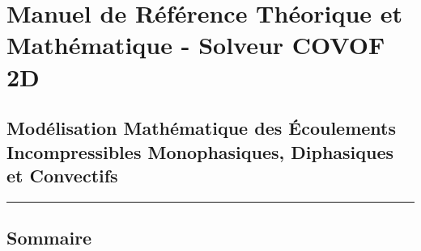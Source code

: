 \documentclass[
  french,
]{article}
\author{}
\date{}
\begin{document}
\section{Manuel de Référence Théorique et Mathématique - Solveur COVOF
2D}\label{manuel-de-ruxe9fuxe9rence-thuxe9orique-et-mathuxe9matique---solveur-covof-2d}

\subsection{Modélisation Mathématique des Écoulements Incompressibles
Monophasiques, Diphasiques et
Convectifs}\label{moduxe9lisation-mathuxe9matique-des-uxe9coulements-incompressibles-monophasiques-diphasiques-et-convectifs}

\begin{center}\rule{0.5\linewidth}{0.5pt}\end{center}

\subsection{Sommaire}\label{sommaire}
\end{document}
